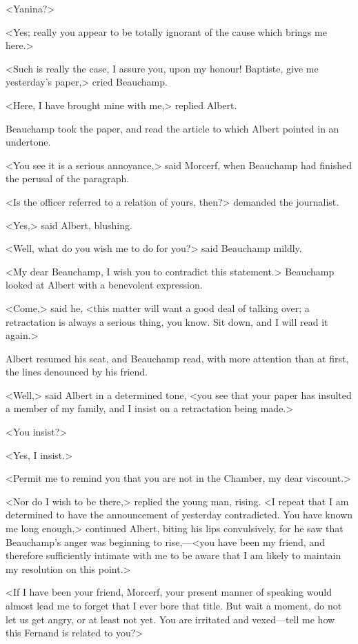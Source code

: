  <Yanina?> 

 <Yes; really you appear to be totally ignorant of the cause which brings me here.> 

 <Such is really the case, I assure you, upon my honour! Baptiste, give me yesterday's paper,> cried Beauchamp. 

 <Here, I have brought mine with me,> replied Albert. 

 Beauchamp took the paper, and read the article to which Albert pointed in an undertone. 

 <You see it is a serious annoyance,> said Morcerf, when Beauchamp had finished the perusal of the paragraph. 

 <Is the officer referred to a relation of yours, then?> demanded the journalist. 

 <Yes,> said Albert, blushing. 

 <Well, what do you wish me to do for you?> said Beauchamp mildly. 

 <My dear Beauchamp, I wish you to contradict this statement.> Beauchamp looked at Albert with a benevolent expression. 

 <Come,> said he, <this matter will want a good deal of talking over; a retractation is always a serious thing, you know. Sit down, and I will read it again.> 

 Albert resumed his seat, and Beauchamp read, with more attention than at first, the lines denounced by his friend. 

 <Well,> said Albert in a determined tone, <you see that your paper has insulted a member of my family, and I insist on a retractation being made.> 

 <You insist?> 

 <Yes, I insist.> 

 <Permit me to remind you that you are not in the Chamber, my dear viscount.> 

 <Nor do I wish to be there,> replied the young man, rising. <I repeat that I am determined to have the announcement of yesterday contradicted. You have known me long enough,> continued Albert, biting his lips convulsively, for he saw that Beauchamp's anger was beginning to rise,—<you have been my friend, and therefore sufficiently intimate with me to be aware that I am likely to maintain my resolution on this point.> 

 <If I have been your friend, Morcerf, your present manner of speaking would almost lead me to forget that I ever bore that title. But wait a moment, do not let us get angry, or at least not yet. You are irritated and vexed—tell me how this Fernand is related to you?> 

